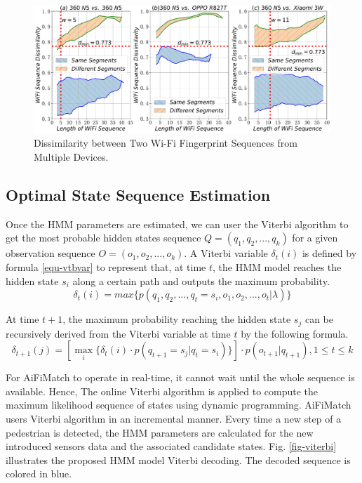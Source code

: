 \documentclass{llncs}
\begin{document}
\vspace{-10pt}
\begin{figure}[!htbp]
	\centering
	\includegraphics[width=4.94in]{AiFiMatch-WiFiJCD}
	\caption{Dissimilarity between Two Wi-Fi Fingerprint Sequences from Multiple Devices.}
	\label{fig-wifidist}
\end{figure}
\vspace{-20pt}

\subsection{Optimal State Sequence Estimation}

Once the HMM parameters are estimated, we can user the Viterbi algorithm to get the most probable hidden states sequence $Q = ({q_1},{q_2},...,{q_k})$ for a given observation sequence $O = ({o_1},{o_2},...,{o_k})$. A Viterbi variable ${\delta _t}(i)$ is defined by formula \ref{equ-vtbvar} to represent that, at time $t$, the HMM model reaches the hidden state $s_i$ along a certain path and outputs the maximum probability.
\begin{equation}
	\label{equ-vtbvar}
	{\delta _t}(i) = max\{ p({q_1},{q_2},...,{q_t} = {s_i},{o_1},{o_2},...,{o_t}|\lambda )\}
\end{equation}

At time $t+1$, the maximum probability reaching the hidden state $s_j$ can be recursively derived from the Viterbi variable at time $t$ by the following formula. 
\begin{equation}
	{\delta _{t + 1}}(j) = [\mathop {max}\limits_i \{ {\delta _t}(i) \cdot p({q_{t + 1}} = {s_j}|{q_t} = {s_i})\} ] \cdot p({o_{t + 1}}|{q_{t + 1}}),1 \le t \le k
\end{equation}

For AiFiMatch to operate in real-time, it cannot wait until the whole sequence is available. Hence, The online Viterbi algorithm \cite{bloit2008short} is applied to compute the maximum likelihood sequence of states using dynamic programming. AiFiMatch users Viterbi algorithm in an incremental manner. Every time a new step of a pedestrian is detected, the HMM parameters are calculated for the new introduced sensors data and the associated candidate states.  Fig. \ref{fig-viterbi} illustrates the proposed HMM model Viterbi decoding. The decoded sequence is colored in blue.
\end{document}
